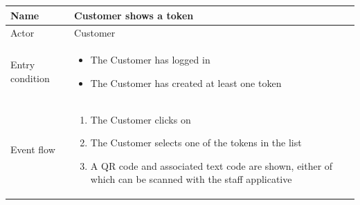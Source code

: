 \begin{table}[H]
    \begin{tabu} to \textwidth {|X|X[4]|}
        \hline
        Name            & Customer shows a token     \\ \hline
        Actor           & Customer                   \\ \hline
        Entry condition & \begin{itemize}
            \item The Customer has logged in
            \item The Customer has created at least one token
        \end{itemize} \\ \hline
        Event flow      & \begin{enumerate}
            \item The Customer clicks on 
            \item The Customer selects one of the tokens in the list
            \item A QR code and associated text code are shown, either of which can be scanned with the staff applicative
        \end{enumerate} \\ \hline
    \end{tabu}
\end{table}

